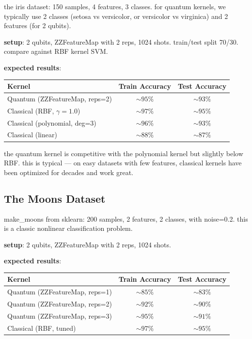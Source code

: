 \documentclass[11pt,a4paper]{article}
\theoremstyle{definition}
\theoremstyle{remark}
\begin{document}
the iris dataset: 150 samples, 4 features, 3 classes. for quantum kernels, we typically use 2 classes (setosa vs versicolor, or versicolor vs virginica) and 2 features (for 2 qubits).

\textbf{setup}: 2 qubits, ZZFeatureMap with 2 reps, 1024 shots. train/test split 70/30. compare against RBF kernel SVM.

\textbf{expected results}:
\begin{center}
\renewcommand{\arraystretch}{1.3}
\begin{tabular}{|l|c|c|}
\hline
\textbf{Kernel} & \textbf{Train Accuracy} & \textbf{Test Accuracy} \\
\hline
Quantum (ZZFeatureMap, reps=2) & $\sim 95\%$ & $\sim 93\%$ \\
\hline
Classical (RBF, $\gamma=1.0$) & $\sim 97\%$ & $\sim 95\%$ \\
\hline
Classical (polynomial, deg=3) & $\sim 96\%$ & $\sim 93\%$ \\
\hline
Classical (linear) & $\sim 88\%$ & $\sim 87\%$ \\
\hline
\end{tabular}
\end{center}

the quantum kernel is competitive with the polynomial kernel but slightly below RBF. this is typical --- on easy datasets with few features, classical kernels have been optimized for decades and work great.

\subsection{The Moons Dataset}

make\_moons from sklearn: 200 samples, 2 features, 2 classes, with noise=0.2. this is a classic nonlinear classification problem.

\textbf{setup}: 2 qubits, ZZFeatureMap with 2 reps, 1024 shots.

\textbf{expected results}:
\begin{center}
\renewcommand{\arraystretch}{1.3}
\begin{tabular}{|l|c|c|}
\hline
\textbf{Kernel} & \textbf{Train Accuracy} & \textbf{Test Accuracy} \\
\hline
Quantum (ZZFeatureMap, reps=1) & $\sim 85\%$ & $\sim 83\%$ \\
\hline
Quantum (ZZFeatureMap, reps=2) & $\sim 92\%$ & $\sim 90\%$ \\
\hline
Quantum (ZZFeatureMap, reps=3) & $\sim 95\%$ & $\sim 91\%$ \\
\hline
Classical (RBF, tuned) & $\sim 97\%$ & $\sim 95\%$ \\
\hline
\end{tabular}
\end{center}
\end{document}
